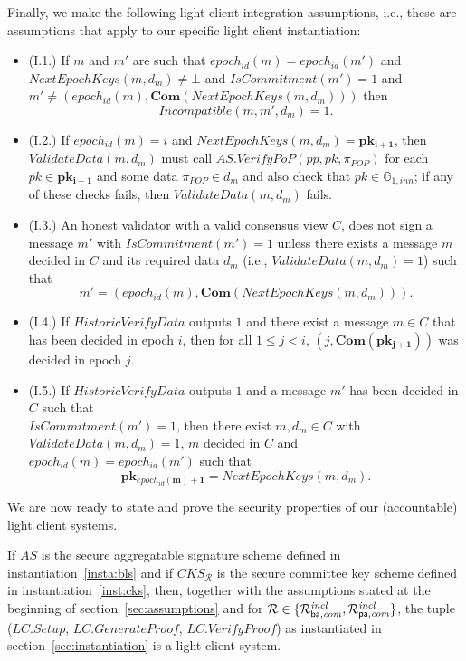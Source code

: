 \noindent Finally, we make the following light client integration assumptions, i.e., these are assumptions that 
apply to our specific light client instantiation: 
\begin{itemize}
\item (I.1.) If $m$ and $m'$ are such that 
$\mathit{epoch_{id}}(m) =\mathit{epoch_{id}}(m')$ and 
$\mathit{NextEpochKeys}(m, d_m) \neq \bot$ and 
$\mathit{IsCommitment}(m') = 1$ and 
$m' \neq (\mathit{epoch_{id}}(m), \mathbf{Com}(\mathit{NextEpochKeys}(m, d_m)))$ 
then $$\mathit{Incompatible}(m, m', d_m)=1.$$
\item (I.2.) If $\mathit{epoch_{id}}(m) =i$ and $\mathit{NextEpochKeys}(m, d_m)=\mathbf{pk_{i+1}}$, 
then $\mathit{ValidateData}(m, d_m)$ must call $\mathit{AS.VerifyPoP}(\mathit{pp}, \mathit{pk}, \mathit{\pi_{POP}})$ 
for each $pk \in \mathbf{pk_{i+1}}$ and some data $\mathit{\pi_{POP}} \in d_m$ and also check that
 $\mathit{pk} \in \mathbb{G}_{1,\mathit{inn}}$; if any of these checks fails, then $\mathit{ValidateData}(m, d_m)$ fails.
\item (I.3.) An honest validator with a valid consensus view $C$, does not sign a message $m'$ 
with $\mathit{IsCommitment}(m')=1$ unless there exists a message $m$ decided in $C$ 
and its required data $d_m$ (i.e., $\mathit{ValidateData}(m, d_m) =1$) such that 
$$m'=(\mathit{epoch_{id}}(m), \mathbf{Com}(\mathit{NextEpochKeys}(m, d_m))).$$ 
\item (I.4.) If $\mathit{HistoricVerifyData}$ outputs $1$ and there exist a message $m \in C$ 
that has been decided in epoch $i$, then for all $1 \leq j < i$, $(j, \mathbf{Com}(\mathbf{pk_{j+1}}))$ was decided in epoch $j$. 
\item (I.5.) If $\mathit{HistoricVerifyData}$ outputs $1$ and a message $m'$ has been decided in $C$ 
such that \\ $\mathit{IsCommitment}(m') = 1$, then there exist $m, d_m \in C$ with $\mathit{ValidateData}(m, d_m) = 1$, $m$ decided in $C$
and $\mathit{epoch_{id}}(m) = \mathit{epoch_{id}}(m')$ such that 
$$\mathbf{pk_{\mathit{epoch_{id}}(m)+1}} = \mathit{NextEpochKeys}(m, d_m).$$
\end{itemize}

\noindent We are now ready to state and prove the security properties of our (accountable) light client systems. 

\begin{theorem}
\label{th:soundness} 
If $\mathit{AS}$ is the secure aggregatable signature scheme defined in instantiation~\ref{insta:bls} and if 
$\mathit{CKS_{\mathcal{R}}}$ is the secure committee key scheme defined in instantiation~\ref{inst:cks}, then, together with 
the assumptions stated at the beginning of section~\ref{sec:assumptions} and for $\mathcal{R} \in \{ \mathcal{R}^{\mathit{incl}}_{\mathsf{ba},\mathit{com}}, \mathcal{R}^{\mathit{incl}}_{\mathsf{pa},\mathit{com}} \}$, the tuple 
($\mathit{LC.Setup}$, $\mathit{LC.GenerateProof}$, $\mathit{LC.VerifyProof}$) as instantiated in section~\ref{sec:instantiation} is a light client system.
\end{theorem}


